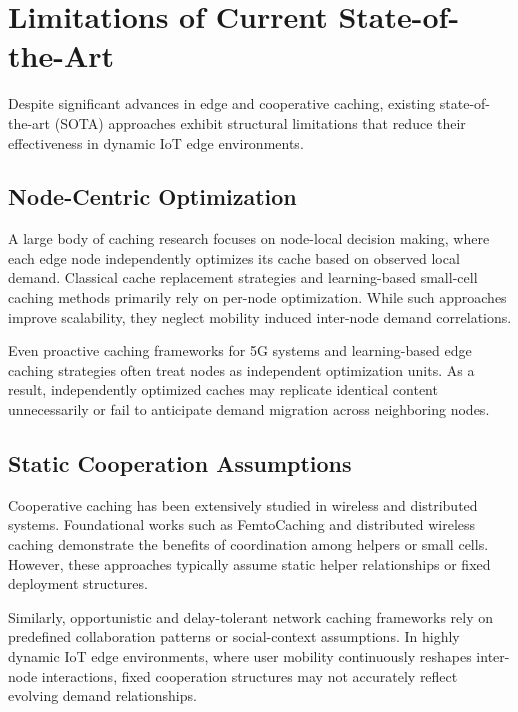 \section{Limitations of Current State-of-the-Art}

Despite significant advances in edge and cooperative caching, existing state-of-the-art (SOTA) approaches exhibit structural limitations that reduce their effectiveness in dynamic IoT edge environments.

\subsection{Node-Centric Optimization}

A large body of caching research focuses on node-local decision making, where each edge node independently optimizes its cache based on observed local demand. Classical cache replacement strategies \cite{Podlipnig2003} and learning-based small-cell caching methods \cite{Blasco2014} primarily rely on per-node optimization. While such approaches improve scalability, they neglect mobility induced inter-node demand correlations.

Even proactive caching frameworks for 5G systems \cite{Bastug2014} and learning-based edge caching strategies \cite{Chen2021TMC} often treat nodes as independent optimization units. As a result, independently optimized caches may replicate identical content unnecessarily or fail to anticipate demand migration across neighboring nodes.

\subsection{Static Cooperation Assumptions}

Cooperative caching has been extensively studied in wireless and distributed systems. Foundational works such as FemtoCaching \cite{Shanmugam2013} and distributed wireless caching \cite{Golrezaei2014JSAC} demonstrate the benefits of coordination among helpers or small cells. However, these approaches typically assume static helper relationships or fixed deployment structures.

Similarly, opportunistic and delay-tolerant network caching frameworks \cite{Mardham2017, Mardham2018, Cabaniss2014} rely on predefined collaboration patterns or social-context assumptions. In highly dynamic IoT edge environments, where user mobility continuously reshapes inter-node interactions, fixed cooperation structures may not accurately reflect evolving demand relationships.

